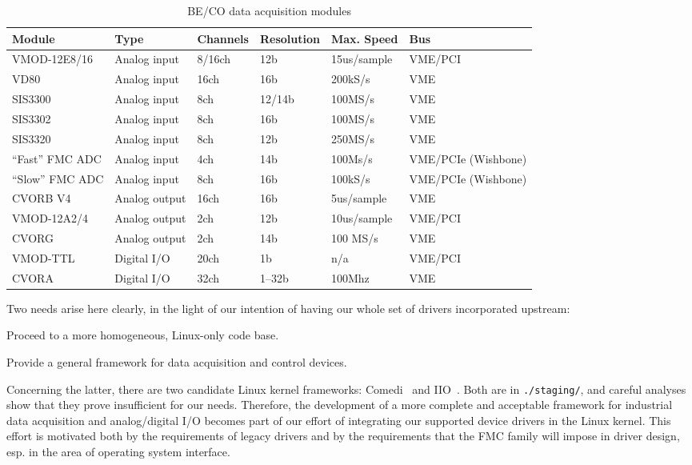 \documentclass{JAC2003}
\begin{document}
\begin{table*}[ht]
   \centering
   \caption{BE/CO data acquisition modules}
   \begin{tabular}{llllll}
       \toprule
	\textbf{Module}& \textbf{Type}& \textbf{Channels}&
	\textbf{Resolution}& \textbf{Max. Speed}& \textbf{Bus} \\
       \midrule
	VMOD-12E8/16    &  Analog input  & 8/16ch & 12b    & 15us/sample & VME/PCI  \\
	VD80            &  Analog input  & 16ch   & 16b    & 200kS/s     & VME  \\
	SIS3300         &  Analog input  & 8ch    & 12/14b & 100MS/s     & VME  \\
	SIS3302         &  Analog input  & 8ch    & 16b    & 100MS/s     & VME  \\
	SIS3320         &  Analog input  & 8ch    & 12b    & 250MS/s     & VME  \\
	``Fast'' FMC ADC&  Analog input  & 4ch    & 14b    & 100Ms/s     & VME/PCIe (Wishbone)  \\
	``Slow'' FMC ADC&  Analog input  & 8ch    & 16b    & 100kS/s     & VME/PCIe (Wishbone)  \\
       \midrule
	CVORB V4        &  Analog output & 16ch   &  16b   &  5us/sample & VME 	 \\
	VMOD-12A2/4     &  Analog output & 2ch    &  12b   &  10us/sample& VME/PCI \\
	CVORG           &  Analog output & 2ch    &  14b   &  100 MS/s   & VME  \\
       \midrule
	VMOD-TTL        &  Digital I/O   & 20ch   & 1b     & n/a         & VME/PCI \\
	CVORA           &  Digital I/O   & 32ch   & 1--32b & 100Mhz	 & VME \\
       \bottomrule
   \end{tabular}
   \label{zio-modules}
\end{table*}

Two needs arise here clearly, in the light of our intention of having our
whole set of drivers incorporated upstream:
\begin{Itemize}
\item Proceed to a more homogeneous, Linux-only code base.
\item Provide a general framework for data acquisition and control
    devices.
\end{Itemize}
Concerning the latter, there are two candidate Linux kernel frameworks:
Comedi~\cite{comedi} and IIO~\cite{iio}. Both are in \texttt{./staging/}, and
careful analyses show that they prove insufficient for our needs. Therefore,
the development of a more complete and acceptable framework for industrial data
acquisition and analog/digital I/O becomes part of our effort of integrating
our supported device drivers in the Linux kernel. This effort is motivated
both by the requirements of legacy drivers and by the requirements that
the FMC family will impose in driver design, esp. in the area of operating
system interface.
\end{document}
